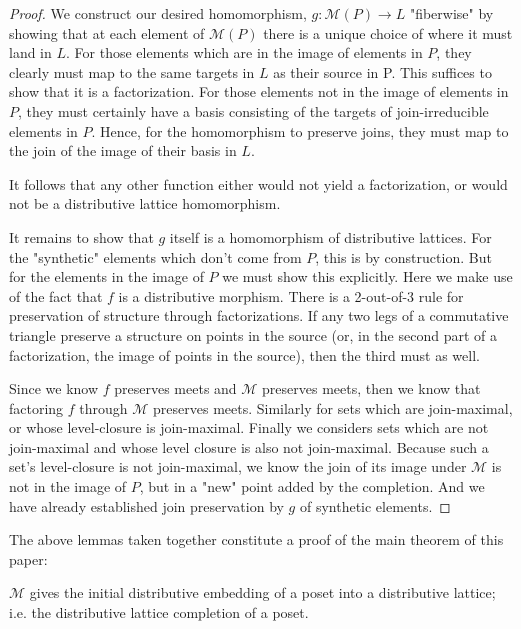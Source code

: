 \documentclass[hoptionsi,review,format=sigplan]{acmart}
\theoremstyle{definition}
\newcommand{\Mcc}{\mathcal{M}}
\begin{document}
\begin{proof}
We construct our desired homomorphism, \(g : \Mcc(P) \rightarrow L\) "fiberwise" by showing that at each element of \(\Mcc(P)\) there is a unique choice of where it must land in \(L\). For those elements which are in the image of elements in \(P\), they clearly must map to the same targets in \(L\) as their source in P. This suffices to show that it is a factorization. For those elements not in the image of elements in \(P\), they must certainly have a basis consisting of the targets of join-irreducible elements in \(P\). Hence, for the homomorphism to preserve joins, they must map to the join of the image of their basis in \(L\). 

It follows that any other function either would not yield a factorization, or would not be a distributive lattice homomorphism.

It remains to show that \(g\) itself is a homomorphism of distributive lattices. For the "synthetic" elements which don't come from \(P\), this is by construction. But for the elements in the image of \(P\) we must show this explicitly. Here we make use of the fact that \(f\) is a distributive morphism. There is a 2-out-of-3 rule for preservation of structure through factorizations. If any two legs of a commutative triangle preserve a structure on points in the source (or, in the second part of a factorization, the image of points in the source), then the third must as well.

Since we know \(f\) preserves meets and \(\Mcc\) preserves meets, then we know that factoring \(f\) through \(\Mcc\) preserves meets. Similarly for sets which are join-maximal, or whose level-closure is join-maximal. Finally we considers sets which are not join-maximal and whose level closure is also not join-maximal. Because such a set's level-closure is not join-maximal, we know the join of its image under \(\Mcc\) is not in the image of \(P\), but in a "new" point added by the completion. And we have already established join preservation by \(g\) of synthetic elements.
\end{proof}

The above lemmas taken together constitute a proof of the main theorem of this paper:
\begin{theorem}

\(\Mcc\) gives the initial distributive embedding of a poset into a distributive lattice; i.e. the distributive lattice completion of a poset.
\end{theorem}
\end{document}
